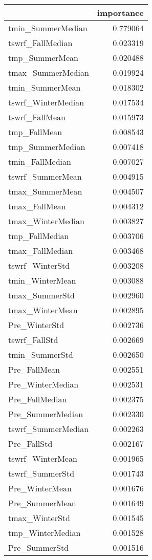 \begin{tabular}{lr}
\toprule
 & importance \\
\midrule
tmin_SummerMedian & 0.779064 \\
tswrf_FallMedian & 0.023319 \\
tmp_SummerMean & 0.020488 \\
tmax_SummerMedian & 0.019924 \\
tmin_SummerMean & 0.018302 \\
tswrf_WinterMedian & 0.017534 \\
tswrf_FallMean & 0.015973 \\
tmp_FallMean & 0.008543 \\
tmp_SummerMedian & 0.007418 \\
tmin_FallMedian & 0.007027 \\
tswrf_SummerMean & 0.004915 \\
tmax_SummerMean & 0.004507 \\
tmax_FallMean & 0.004312 \\
tmax_WinterMedian & 0.003827 \\
tmp_FallMedian & 0.003706 \\
tmax_FallMedian & 0.003468 \\
tswrf_WinterStd & 0.003208 \\
tmin_WinterMean & 0.003088 \\
tmax_SummerStd & 0.002960 \\
tmax_WinterMean & 0.002895 \\
Pre_WinterStd & 0.002736 \\
tswrf_FallStd & 0.002669 \\
tmin_SummerStd & 0.002650 \\
Pre_FallMean & 0.002551 \\
Pre_WinterMedian & 0.002531 \\
Pre_FallMedian & 0.002375 \\
Pre_SummerMedian & 0.002330 \\
tswrf_SummerMedian & 0.002263 \\
Pre_FallStd & 0.002167 \\
tswrf_WinterMean & 0.001965 \\
tswrf_SummerStd & 0.001743 \\
Pre_WinterMean & 0.001676 \\
Pre_SummerMean & 0.001649 \\
tmax_WinterStd & 0.001545 \\
tmp_WinterMedian & 0.001528 \\
Pre_SummerStd & 0.001516 \\

\end{tabular}
